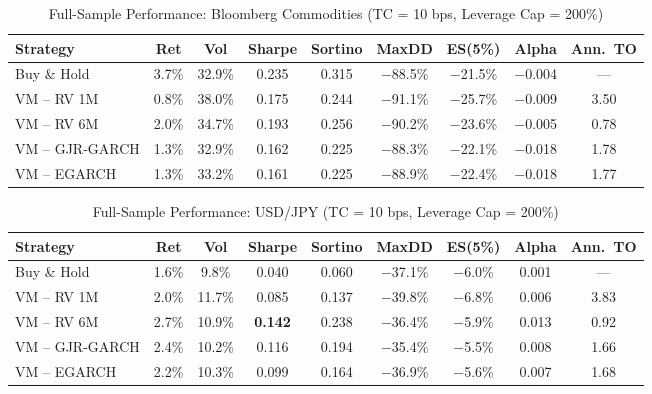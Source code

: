 \documentclass[12pt, a4paper]{article}
\begin{document}
\begin{table}[H]
  \centering
  \caption{Full-Sample Performance: Bloomberg Commodities (TC = 10 bps, Leverage Cap = 200\%)}
  \label{tab:perf_comm}
  \footnotesize
  \begin{tabular}{lcccccccc}
    \toprule
    \textbf{Strategy} & \textbf{Ret} & \textbf{Vol} & \textbf{Sharpe}
                      & \textbf{Sortino} & \textbf{MaxDD} & \textbf{ES(5\%)}
                      & \textbf{Alpha} & \textbf{Ann.~TO} \\
    \midrule
    Buy \& Hold      & 3.7\%  & 32.9\% & 0.235 & 0.315 & $-$88.5\% & $-$21.5\% & $-$0.004 & --- \\
    VM -- RV 1M      & 0.8\%  & 38.0\% & 0.175 & 0.244 & $-$91.1\% & $-$25.7\% & $-$0.009 & 3.50 \\
    VM -- RV 6M      & 2.0\%  & 34.7\% & 0.193 & 0.256 & $-$90.2\% & $-$23.6\% & $-$0.005 & 0.78 \\
    VM -- GJR-GARCH  & 1.3\%  & 32.9\% & 0.162 & 0.225 & $-$88.3\% & $-$22.1\% & $-$0.018 & 1.78 \\
    VM -- EGARCH     & 1.3\%  & 33.2\% & 0.161 & 0.225 & $-$88.9\% & $-$22.4\% & $-$0.018 & 1.77 \\
    \bottomrule
  \end{tabular}
\end{table}

\begin{table}[H]
  \centering
  \caption{Full-Sample Performance: USD/JPY (TC = 10 bps, Leverage Cap = 200\%)}
  \label{tab:perf_fx}
  \footnotesize
  \begin{tabular}{lcccccccc}
    \toprule
    \textbf{Strategy} & \textbf{Ret} & \textbf{Vol} & \textbf{Sharpe}
                      & \textbf{Sortino} & \textbf{MaxDD} & \textbf{ES(5\%)}
                      & \textbf{Alpha} & \textbf{Ann.~TO} \\
    \midrule
    Buy \& Hold      & 1.6\% &  9.8\% & 0.040          & 0.060 & $-$37.1\% & $-$6.0\% & 0.001 & --- \\
    VM -- RV 1M      & 2.0\% & 11.7\% & 0.085          & 0.137 & $-$39.8\% & $-$6.8\% & 0.006 & 3.83 \\
    VM -- RV 6M      & 2.7\% & 10.9\% & \textbf{0.142} & 0.238 & $-$36.4\% & $-$5.9\% & 0.013 & 0.92 \\
    VM -- GJR-GARCH  & 2.4\% & 10.2\% & 0.116          & 0.194 & $-$35.4\% & $-$5.5\% & 0.008 & 1.66 \\
    VM -- EGARCH     & 2.2\% & 10.3\% & 0.099          & 0.164 & $-$36.9\% & $-$5.6\% & 0.007 & 1.68 \\
    \bottomrule
  \end{tabular}
\end{table}
\end{document}
